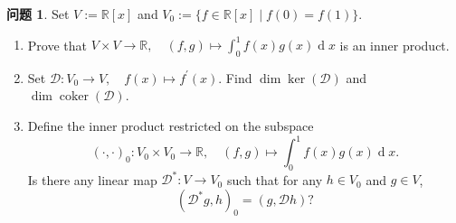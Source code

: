 \documentclass{MainStyle}
\theoremstyle{definition}
\newtheorem{problem}{问题}
\begin{document}
\begin{problem}
Set $V:=\mathbb R[x]$ and $V_0:=\{f\in \mathbb R[x]\mid f(0)=f(1)\}$.
\begin{enumerate}
    \item Prove that $V\times V\to \mathbb R,\quad (f,g)\mapsto \int_0^1 f(x)g(x)\operatorname dx$ is an inner product.
    \item Set $\mathscr D:V_0\to V,\quad f(x)\mapsto f^\prime (x)$. Find $\dim\ker(\mathscr D)$ and $\dim\operatorname{coker}(\mathscr D)$.
    \item Define the inner product restricted on the subspace
          \begin{equation*}
              (\cdot ,\cdot )_0:V_0\times V_0\to \mathbb R,\quad (f,g)\mapsto \int_0^1 f(x)g(x)\operatorname d x.
          \end{equation*}
          Is there any linear map $\mathscr D^\ast:V\to V_0$ such that for any $h\in V_0$ and $g\in V$,
          \begin{equation*}
              (\mathscr D^\ast g,h)_0=(g,\mathscr Dh)?
          \end{equation*}
\end{enumerate}
\end{problem}
\end{document}
